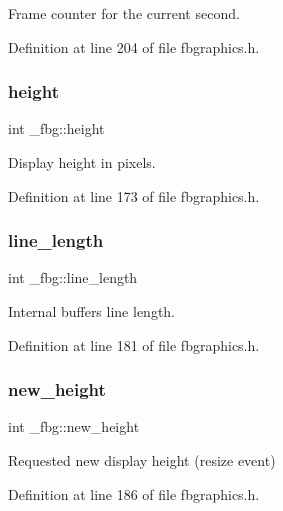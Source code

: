 Frame counter for the current second. 



Definition at line 204 of file fbgraphics.\+h.

\mbox{\label{struct__fbg_a3a3bd409e71d020fa77f69a541d832f8}} 
\subsubsection{\texorpdfstring{height}{height}}
{\footnotesize\ttfamily int \+\_\+fbg\+::height}



Display height in pixels. 



Definition at line 173 of file fbgraphics.\+h.

\mbox{\label{struct__fbg_af8a1ee8d7004e6f2193f2a3ed98f8ce8}} 
\subsubsection{\texorpdfstring{line\+\_\+length}{line\_length}}
{\footnotesize\ttfamily int \+\_\+fbg\+::line\+\_\+length}



Internal buffers line length. 



Definition at line 181 of file fbgraphics.\+h.

\mbox{\label{struct__fbg_a509aa5f8f0a94d8313bb4da777aa64bc}} 
\subsubsection{\texorpdfstring{new\+\_\+height}{new\_height}}
{\footnotesize\ttfamily int \+\_\+fbg\+::new\+\_\+height}



Requested new display height (resize event) 



Definition at line 186 of file fbgraphics.\+h.


